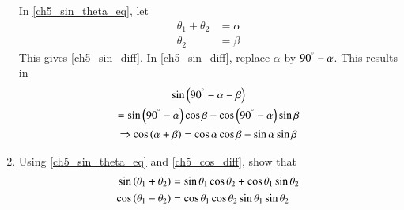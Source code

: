 \begin{enumerate}[label=\arabic*.,ref=\thesubsection.\theenumi]
\solution In \eqref{ch5_sin_theta_eq}, let
%
\begin{equation}
\begin{split}
\theta_1 + \theta_2 &= \alpha \\
\theta_2 &=  \beta
\end{split}
\end{equation}
%
This gives \eqref{ch5_sin_diff}.  In \eqref{ch5_sin_diff}, replace $\alpha$ by 
%
$90^{\degree} - \alpha$.  This results in
%
\begin{multline}
\sin\left(90^{\degree} - \alpha - \beta\right)
\\
=
\sin \left(90^{\degree} -\alpha\right) \cos \beta - \cos \left(90^{\degree} -\alpha\right) \sin \beta \\
\Rightarrow \cos\left(\alpha + \beta\right) = \cos \alpha \cos \beta - \sin \alpha \sin \beta
\end{multline}
% 
\item
	Using \eqref{ch5_sin_theta_eq} and \eqref{ch5_cos_diff}, show that
\begin{align}
\label{ch5_sin_sum}
\sin\left(\theta_1 + \theta_2\right) &= \sin\theta_1  \cos\theta_2 + \cos\theta_1\sin\theta_2
\\
\cos\left(\theta_1 - \theta_2\right) &= \cos\theta_1  \cos\theta_2  \sin\theta_1\sin\theta_2
\label{ch5_cos_sum}
\end{align}


\end{enumerate}
